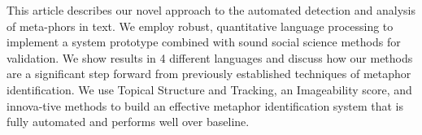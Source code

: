 This article describes our novel approach to the automated detection and analysis of meta-phors in text. We employ robust, quantitative language
 processing to implement a system prototype combined with sound social science
 methods for validation. We show results in 4 different languages and discuss
 how our methods are a significant step forward from previously established
 techniques of metaphor identification. We use Topical Structure and Tracking,
 an Imageability score, and innova-tive methods to build an effective metaphor
 identification system that is fully automated and performs well over baseline.

